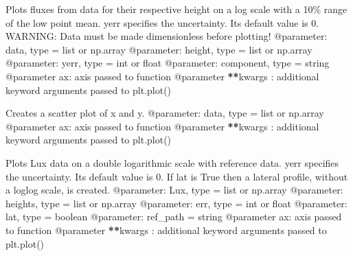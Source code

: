 \documentclass[letterpaper,10pt,english]{sphinxmanual}
\begin{document}
\begin{fulllineitems}
\label{\detokenize{index:windtunnel.plot_fluxes_log}}
Plots fluxes from data for their respective height on a log scale with
a 10\% range of the low point mean. yerr specifies the uncertainty. Its 
default value is 0. WARNING: Data must be made dimensionless before 
plotting!
@parameter: data, type = list or np.array
@parameter: height, type = list or np.array
@parameter: yerr, type = int or float
@parameter: component, type = string
@parameter ax: axis passed to function
@parameter {\color{red}\bfseries{}**}kwargs : additional keyword arguments passed to plt.plot()

\end{fulllineitems}


\begin{fulllineitems}
\label{\detokenize{index:windtunnel.plot_hist}}
Creates a scatter plot of x and y.
@parameter: data, type = list or np.array
@parameter ax: axis passed to function
@parameter {\color{red}\bfseries{}**}kwargs : additional keyword arguments passed to plt.plot()

\end{fulllineitems}


\begin{fulllineitems}
\label{\detokenize{index:windtunnel.plot_lux}}
Plots Lux data on a double logarithmic scale with reference data. yerr
specifies the uncertainty. Its default value is 0. If lat
is True then a lateral profile, without a loglog scale, is created.
@parameter: Lux, type = list or np.array
@parameter: heights, type = list or np.array
@parameter: err, type = int or float
@parameter: lat, type = boolean
@parameter: ref\_path = string
@parameter ax: axis passed to function
@parameter {\color{red}\bfseries{}**}kwargs : additional keyword arguments passed to plt.plot()

\end{fulllineitems}
\end{document}
